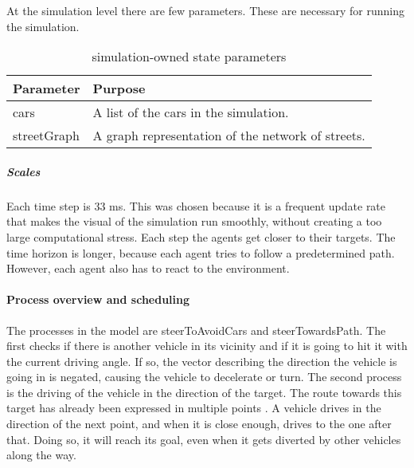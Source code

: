 	At the simulation level there are few parameters. These are necessary for running the simulation.
	
	\begin{table}[H]
		\centering
		\begin{tabular}{|l | p{10.5cm} |}
			\hline
			Parameter				& Purpose \\ \hline \hline
			cars 					& A list of the cars in the simulation. \\ \hline
			streetGraph		 		& A graph representation of the network of streets. \\ \hline
		\end{tabular}
		\caption{simulation-owned state parameters}
		\label{tab:par:method:model:overview:state:highlevel:sim}
	\end{table}


	\subparagraph{Scales}


	Each time step is 33 ms. This was chosen because it is a frequent update rate that makes the visual of the simulation run smoothly, without creating a too large computational stress. Each step the agents get closer to their targets. The time horizon is longer, because each agent tries to follow a predetermined path. However, each agent also has to react to the environment. 



\paragraph{Process overview and scheduling}
\label{par:method:model:overview:process}

The processes in the model are steerToAvoidCars and steerTowardsPath. 
The first checks if there is another vehicle in its vicinity and if it is going to hit it with the current driving angle. If so, the vector describing the direction the vehicle is going in is negated, causing the vehicle to decelerate or turn.
The second process is the driving of the vehicle in the direction of the target. The route towards this target has already been expressed in multiple points . A vehicle drives in the direction of the next point, and when it is close enough, drives to the one after that. Doing so, it will reach its goal, even when it gets diverted by other vehicles along the way.

